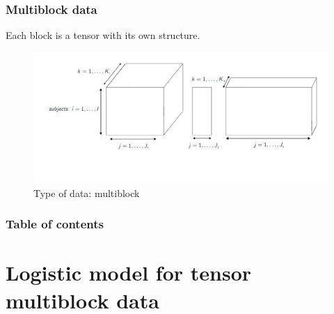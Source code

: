 \documentclass{beamer}
\begin{document}
\begin{frame}
    \frametitle{Multiblock data}
Each block is a tensor with its own structure.
    \begin{figure}
        \centering
        \includegraphics[scale = 0.25]{images/blocks.png}
        \caption{Type of data: multiblock}
    \end{figure}


\end{frame}



    


\begin{frame}
    \frametitle{Table of contents}
    \tableofcontents
\end{frame}

\section{Logistic model for tensor multiblock data}
\begin{frame}
\sectionpage
\end{frame}
\end{document}
